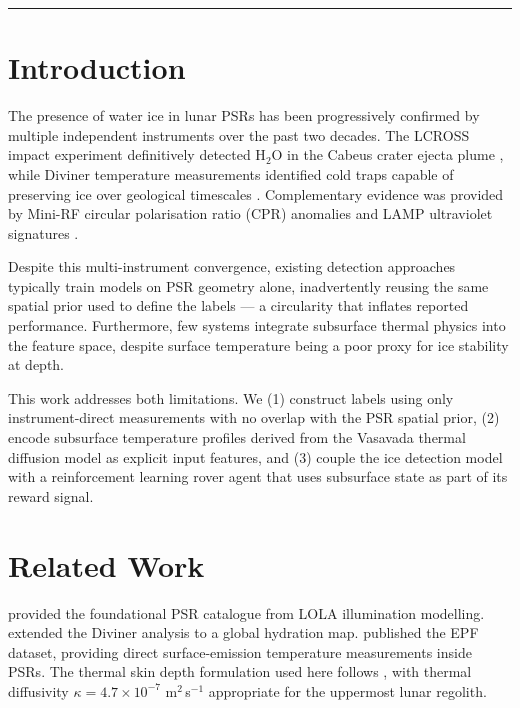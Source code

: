 \documentclass[12pt,a4paper]{article}
\begin{document}
\hrule
\vspace{1em}

\section{Introduction}

The presence of water ice in lunar PSRs has been progressively confirmed by multiple
independent instruments over the past two decades. The LCROSS impact experiment
definitively detected H$_2$O in the Cabeus crater ejecta plume \citep{colaprete2010},
while Diviner temperature measurements identified cold traps capable of preserving
ice over geological timescales \citep{paige2010}. Complementary evidence was provided
by Mini-RF circular polarisation ratio (CPR) anomalies \citep{spudis2010} and LAMP
ultraviolet signatures \citep{gladstone2010}.

Despite this multi-instrument convergence, existing detection approaches typically
train models on PSR geometry alone, inadvertently reusing the same spatial prior used
to define the labels — a circularity that inflates reported performance. Furthermore,
few systems integrate subsurface thermal physics into the feature space, despite
surface temperature being a poor proxy for ice stability at depth.

This work addresses both limitations. We (1) construct labels using only
instrument-direct measurements with no overlap with the PSR spatial prior, (2) encode
subsurface temperature profiles derived from the Vasavada thermal diffusion model as
explicit input features, and (3) couple the ice detection model with a reinforcement
learning rover agent that uses subsurface state as part of its reward signal.

\section{Related Work}

\citet{mazarico2011} provided the foundational PSR catalogue from LOLA illumination
modelling. \citet{hayne2015} extended the Diviner analysis to a global hydration map.
\citet{williams2019} published the EPF dataset, providing direct surface-emission
temperature measurements inside PSRs. The thermal skin depth formulation used here
follows \citet{vasavada2012}, with thermal diffusivity $\kappa = 4.7 \times 10^{-7}$
m$^2$\,s$^{-1}$ appropriate for the uppermost lunar regolith.
\end{document}
